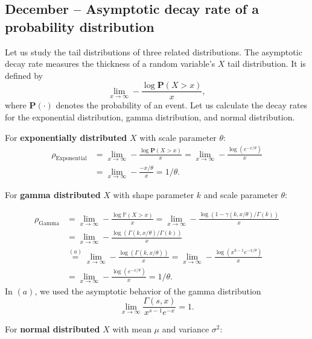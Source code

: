 \documentclass{article}
\begin{document}
\subsection{December – Asymptotic decay rate of a probability distribution}


Let us study the tail distributions of three related distributions. The asymptotic decay rate measures the thickness of a random variable's $X$ tail distribution. It is defined by
\begin{equation}
  \lim_{x \rightarrow \infty} -\frac{\log\textbf{P}(X > x)}{x},
\end{equation}
where $\textbf{P}(\cdot)$ denotes the probability of an event. Let us calculate the decay rates for the exponential distribution, gamma distribution, and normal distribution.

For \textbf{exponentially distributed} $X$ with scale parameter $\theta$:
\begin{align}
  \rho_{\text{Exponential}} &=\lim_{x \rightarrow \infty} -\frac{\log\textbf{P}(X > x)}{x}  = \lim_{x \rightarrow \infty} -\frac{\log(e^{- x/\theta})}{x}   \nonumber \\
  &=\lim_{x \rightarrow \infty} -\frac{-x/\theta }{x } = 1/\theta.
\end{align}

For \textbf{gamma distributed} $X$ with shape parameter $k$ and scale parameter $\theta$:

\begin{align}
  \rho_{\text{Gamma}} &= \lim_{x\rightarrow \infty} -\frac{\log \mathbb{P}(X>x)}{x} = \lim_{x\rightarrow \infty} -\frac{\log (1-\gamma(k,x/\theta)/\Gamma(k))}{x} \nonumber  \\
  &=\lim_{x\rightarrow \infty} -\frac{\log (\Gamma(k,x/\theta)/\Gamma(k))}{x} \nonumber \\
  &\overset{(a)}{=} \lim_{x\rightarrow \infty} -\frac{\log (\Gamma(k,x/\theta))}{x} = \lim_{x\rightarrow \infty} -\frac{\log\left(x^{k-1}e^{-x/\theta}\right) }{x}\label{line:22} \nonumber \\
  &= \lim_{x\rightarrow \infty} -\frac{\log \left(e^{-x/\theta}\right)}{x} = 1/\theta. 
\end{align}
In $(a)$, we used the asymptotic behavior of the gamma distribution
$$
\lim_{x \rightarrow \infty}\frac{\Gamma(s,x)}{x^{s-1}e^{-x}} = 1.
$$

For \textbf{normal distributed} $X$ with mean $\mu$ and variance $\sigma^2$:
\end{document}
